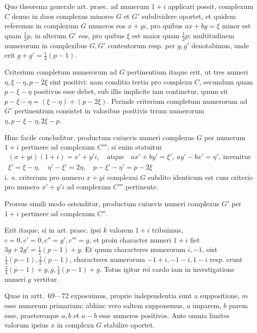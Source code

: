 %
Quo theorema generale art. praec. ad numerum $1+i$ applicari possit, complexum $C$ denuo in duos complexus minores $G$ et $G'$ subdividere oportet, et quidem referemus in complexum $G$ numeros eos $x+yi$, pro quibus $ax+by=\xi$ minor est quam $\frac12p$, in alterum $G'$ eos, pro quibus $\xi$ est maior quam $\frac12p$; multitudinem numerorum in complexibus $G,G'$ contentorum resp. per $g,g'$ denotabimus, unde erit $g+g'=\frac14(p-1)$.

Criterium completum numerorum ad $G$ pertinentium itaque erit, ut tres numeri $\eta,\xi-\eta,p-2\xi$ sint positivi: nam conditio tertia pro complexu $C$, secundum quam $p-\xi-\eta$ positivus esse debet, sub illis implicite iam continetur, quum sit $p-\xi-\eta=(\xi-\eta)+(p-2\xi)$. Perinde criterium completum numerorum ad $G'$ pertinentium consistet in valoribus positivis trium numerorum $\eta,p-\xi-\eta,2\xi-p$.

Hinc facile concluditur, productum cuiusvis numeri complexus $G$ per numerum $1+i$ pertinere ad complexum $C'''$; si enim statuitur
\[
\begin{gathered}
(x+yi)(1+i)=x'+y'i,\quad\text{atque}\quad ax'+by'=\xi',\ ay'-bx'=\eta',\ \text{invenitur}\\
\xi'=\xi-\eta,\quad\eta'-\xi'=2\eta,\quad p-\xi'-\eta'=p-2\xi
\end{gathered}
\]
i.~e. criterium pro numero $x+yi$ complexui $G$ subdito identicum est cum criterio pro numero $x'+y'i$ ad complexum $C'''$ pertinente.

Prorsus simili modo ostenditur, productum cuiusvis numeri complexus $G'$ per $1+i$ pertinere ad complexum $C''$.

Erit itaque, si in art. praec. ipsi $k$ valorem $1+i$ tribuimus, $c=0,c'=0,c''=g',c'''=g$, et proin character numeri $1+i$ fiet $3g+2g'=\frac12(p-1)+g$. Et quum characteres numerorum $i,-1$, sint $\frac14(p-1),\frac12(p-1)$, characteres numerorum $-1+i,-1-i,1-i$ resp. erunt $\frac34(p-1)+g,g,\frac14(p-1)+g$. Totus igitur rei cardo iam in investigatione numeri $g$ vertitur.

Quae in artt.~69---72 exposuimus, proprie independentia sunt a suppositione, $m$ esse numerum primarium: abhinc vero saltem supponemus, $a$ imparem, $b$ parem esse, praetereaque $a,b$ et $a-b$ esse numeros positivos. Ante omnia limites valorum ipsius $x$ in complexu $G$ stabilire oportet.

